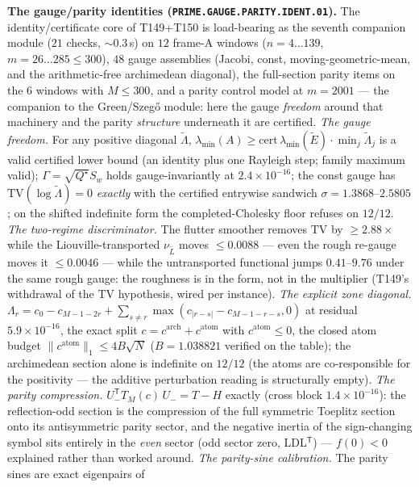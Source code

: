 \documentclass[11pt,a4paper]{article}
\theoremstyle{definition}
\begin{document}
\par\smallskip\noindent\textbf{The gauge/parity identities
(\texttt{PRIME.GAUGE.PARITY.IDENT.01}).}
The identity/certificate core of T149+T150 is load-bearing as the seventh
companion module ($21$ checks, ${\sim}0.3$\,s) on $12$ frame-A windows
($n=4\ldots139$, $m=26\ldots285\le300$), $48$ gauge assemblies (Jacobi,
const, moving-geometric-mean, and the arithmetic-free archimedean diagonal),
the full-section parity items on the $6$ windows with $M\le300$, and a
parity control model at $m=2001$ --- the companion to the Green/Szeg\H{o}
module: here the gauge \emph{freedom} around that machinery and the parity
\emph{structure} underneath it are certified.
\emph{The gauge freedom.} For any positive diagonal $\tilde\Lambda$,
$\lambda_{\min}(A)\ge\mathrm{cert}\,\lambda_{\min}(\tilde E)\cdot
\min_j\tilde\Lambda_j$ is a valid certified lower bound (an identity plus
one Rayleigh step; family maximum valid); $\Gamma=\sqrt{Q^\star}S_w$ holds
gauge-invariantly at $2.4\times10^{-16}$; the const gauge has
$\mathrm{TV}(\log\tilde\Lambda)=0$ \emph{exactly} with the certified
entrywise sandwich $\sigma=1.3868$--$2.5805$; on the shifted indefinite
form the completed-Cholesky floor refuses on $12/12$.
\emph{The two-regime discriminator.} The flutter smoother removes
$\mathrm{TV}$ by $\ge2.88\times$ while the Liouville-transported
$\nu_{\tilde L}$ moves $\le0.0088$ --- even the rough re-gauge moves it
$\le0.0046$ --- while the untransported functional jumps $0.41$--$9.76$
under the same rough gauge: the roughness is in the form, not in the
multiplier (T149's withdrawal of the TV hypothesis, wired per instance).
\emph{The explicit zone diagonal.}
$\Lambda_r=c_0-c_{M-1-2r}+\sum_{s\ne r}\max(c_{|r-s|}-c_{M-1-r-s},0)$ at
residual $5.9\times10^{-16}$, the exact split
$c=c^{\mathrm{arch}}+c^{\mathrm{atom}}$ with $c^{\mathrm{atom}}\le0$, the
closed atom budget $\|c^{\mathrm{atom}}\|_1\le4B\sqrt N$ ($B=1.038821$
verified on the table); the archimedean section alone is indefinite on
$12/12$ (the atoms are co-responsible for the positivity --- the additive
perturbation reading is structurally empty).
\emph{The parity compression.} $U_-^{\mathsf T}T_M(c)\,U_-=T-H$ exactly
(cross block $1.4\times10^{-16}$): the reflection-odd section is the
compression of the full symmetric Toeplitz section onto its antisymmetric
parity sector, and the negative inertia of the sign-changing symbol sits
entirely in the \emph{even} sector (odd sector zero, LDL$^{\mathsf T}$) ---
$f(0)<0$ explained rather than worked around.
\emph{The parity-sine calibration.} The parity sines are exact eigenpairs of
\end{document}
